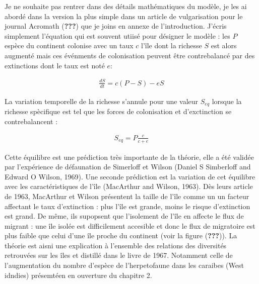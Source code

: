 Je ne souhaite pas rentrer dans des détails mathématiques du modèle, je
les ai abordé dans la version la plus simple dans un article de
vulgarisation pour le journal Acromath ({\textbf{???}}) que je joins en
annexe de l'introduction. J'écris simplement l'équation qui est souvent
utiisé pour désigner le modèle : les \(P\) espèce du continent colonise
avec un taux \(c\) l'île dont la richesse \(S\) est alors augmenté mais
ces événments de colonisation peuvent être contrebalancé par des
extinctions dont le taux est noté \(e\):

\begin{eqnarray}
\label{eqMW}
\frac{dS}{dt} = c(P-S)-eS
\end{eqnarray}

La variation temporelle de la richesse s'annule pour une valeur
\(S_{eq}\) lorsque la richesse spècifique est tel que les forces de
colonisation et d'exctinction se contrebalancent :

\begin{eqnarray}
S_{eq} = P \frac{c}{c+e}
\end{eqnarray}

Cette équilibre est une prédiction très importante de la théorie, elle a
été validée par l'expérience de défaunation de Simerloff et Wilson
(Daniel S Simberloff and Edward O Wilson, 1969). Une seconde prédiction
est la variation de cet équilibre avec les caractéristiques de l'île
(MacArthur and Wilson, 1963). Dès leurs article de 1963, MacArthur et
Wilson présentent la taille de l'île comme un un facteur affectant le
taux d'extinction : plus l'île est grande, moins le risque d'extinction
est grand. De même, ils supopsent que l'isolement de l'île en affecte le
flux de migrant : une île isolée est difficilement accesible et donc le
flux de migratoire est plus faible que celui d'une île proche du
continent (voir la figure ({\textbf{???}})). La théorie est aisni une
explication à l'ensemble des relations des diversités retrouvées sur les
îles et distillé dans le livre de 1967. Notamment celle de
l'augmentation du nombre d'espèce de l'herpetofaune dans les caraibes
(West idndies) présemtéen en ouverture du chapitre 2.

